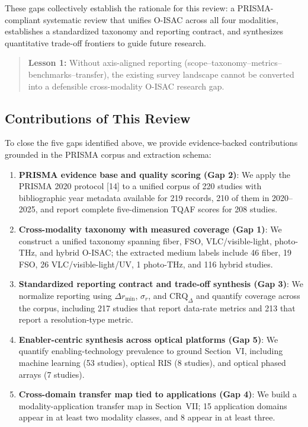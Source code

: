 These gaps collectively establish the rationale for this review: a PRISMA-compliant systematic review that unifies O-ISAC across all four modalities, establishes a standardized taxonomy and reporting contract, and synthesizes quantitative trade-off frontiers to guide future research.

\begin{quote}
\textbf{Lesson 1:} Without axis-aligned reporting (scope--taxonomy--metrics--benchmarks--transfer), the existing survey landscape cannot be converted into a defensible cross-modality O-ISAC research gap.
\end{quote}

\subsection{Contributions of This Review}

To close the five gaps identified above, we provide evidence-backed contributions grounded in the PRISMA corpus and extraction schema:
\begin{enumerate}
\item \textbf{PRISMA evidence base and quality scoring (Gap 2)}: We apply the PRISMA 2020 protocol [14] to a unified corpus of 220 studies with bibliographic year metadata available for 219 records, 210 of them in 2020--2025, and report complete five-dimension TQAF scores for 208 studies.
\item \textbf{Cross-modality taxonomy with measured coverage (Gap 1)}: We construct a unified taxonomy spanning fiber, FSO, VLC/visible-light, photo-THz, and hybrid O-ISAC; the extracted medium labels include 46 fiber, 19 FSO, 26 VLC/visible-light/UV, 1 photo-THz, and 116 hybrid studies.
\item \textbf{Standardized reporting contract and trade-off synthesis (Gap 3)}: We normalize reporting using $\Delta r_{\min}$, $\sigma_r$, and $\mathrm{CRQ}_{\Delta}$ and quantify coverage across the corpus, including 217 studies that report data-rate metrics and 213 that report a resolution-type metric.
\item \textbf{Enabler-centric synthesis across optical platforms (Gap 5)}: We quantify enabling-technology prevalence to ground Section~VI, including machine learning (53 studies), optical RIS (8 studies), and optical phased arrays (7 studies).
\item \textbf{Cross-domain transfer map tied to applications (Gap 4)}: We build a modality-application transfer map in Section~VII; 15 application domains appear in at least two modality classes, and 8 appear in at least three.
\end{enumerate}

